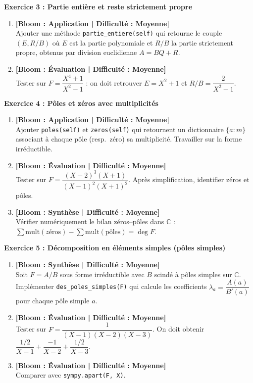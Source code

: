 \documentclass[12pt,a4paper]{report}
\theoremstyle{definition}
\theoremstyle{remark}
\begin{document}
\vspace{0.3cm}

\noindent\textbf{Exercice 3 : Partie entière et reste strictement propre}
\begin{enumerate}
    \item \textbf{[Bloom : Application | Difficulté : Moyenne]} \\
    Ajouter une méthode \texttt{partie\_entiere(self)} qui retourne le couple $(E, R/B)$ où $E$ est la partie polynomiale et $R/B$ la partie strictement propre, obtenus par division euclidienne $A = BQ + R$.
    \item \textbf{[Bloom : Évaluation | Difficulté : Moyenne]} \\
    Tester sur $F = \dfrac{X^4 + 1}{X^2 - 1}$ : on doit retrouver $E = X^2 + 1$ et $R/B = \dfrac{2}{X^2 - 1}$.
\end{enumerate}

\vspace{0.3cm}

\noindent\textbf{Exercice 4 : Pôles et zéros avec multiplicités}
\begin{enumerate}
    \item \textbf{[Bloom : Application | Difficulté : Moyenne]} \\
    Ajouter \texttt{poles(self)} et \texttt{zeros(self)} qui retournent un dictionnaire $\{a : m\}$ associant à chaque pôle (resp.\ zéro) sa multiplicité. Travailler sur la forme irréductible.
    \item \textbf{[Bloom : Évaluation | Difficulté : Moyenne]} \\
    Tester sur $F = \dfrac{(X - 2)^3 (X + 1)}{(X - 1)^2 (X + 1)^2}$. Après simplification, identifier zéros et pôles.
    \item \textbf{[Bloom : Synthèse | Difficulté : Moyenne]} \\
    Vérifier numériquement le bilan zéros--pôles dans $\mathbb{C}$ :
    $\sum \mathrm{mult}(z\text{éros}) - \sum \mathrm{mult}(\text{pôles}) = \deg F$.
\end{enumerate}

\vspace{0.3cm}

\noindent\textbf{Exercice 5 : Décomposition en éléments simples (pôles simples)}
\begin{enumerate}
    \item \textbf{[Bloom : Synthèse | Difficulté : Moyenne]} \\
    Soit $F = A/B$ sous forme irréductible avec $B$ scindé à pôles simples sur $\mathbb{C}$. Implémenter \texttt{des\_poles\_simples(F)} qui calcule les coefficients $\lambda_a = \dfrac{A(a)}{B'(a)}$ pour chaque pôle simple $a$.
    \item \textbf{[Bloom : Évaluation | Difficulté : Moyenne]} \\
    Tester sur $F = \dfrac{1}{(X - 1)(X - 2)(X - 3)}$. On doit obtenir $\dfrac{1/2}{X-1} + \dfrac{-1}{X-2} + \dfrac{1/2}{X-3}$.
    \item \textbf{[Bloom : Évaluation | Difficulté : Moyenne]} \\
    Comparer avec \texttt{sympy.apart(F, X)}.
\end{enumerate}
\end{document}
